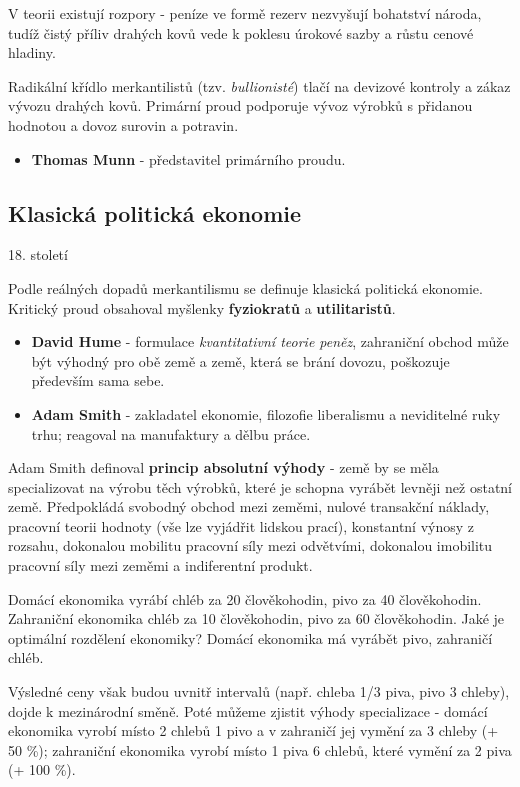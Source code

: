 V teorii existují rozpory - peníze ve formě rezerv nezvyšují bohatství národa, tudíž čistý příliv drahých kovů vede k poklesu úrokové sazby a růstu cenové hladiny.

Radikální křídlo merkantilistů (tzv. \textit{bullionisté}) tlačí na devizové kontroly a zákaz vývozu drahých kovů. Primární proud podporuje vývoz výrobků s přidanou hodnotou a dovoz surovin a potravin.

\begin{itemize}
    \item \textbf{Thomas Munn} - představitel primárního proudu.
\end{itemize}

\subsection{Klasická politická ekonomie}
\epigraph{18. století}{}

Podle reálných dopadů merkantilismu se definuje klasická politická ekonomie. Kritický proud obsahoval myšlenky \textbf{fyziokratů} a \textbf{utilitaristů}.

\begin{itemize}
    \item \textbf{David Hume} - formulace \textit{kvantitativní teorie peněz}, zahraniční obchod může být výhodný pro obě země a země, která se brání dovozu, poškozuje především sama sebe.
    \item \textbf{Adam Smith} - zakladatel ekonomie, filozofie liberalismu a neviditelné ruky trhu; reagoval na manufaktury a dělbu práce.
\end{itemize}

Adam Smith definoval \textbf{princip absolutní výhody} - země by se měla specializovat na výrobu těch výrobků, které je schopna vyrábět levněji než ostatní země. Předpokládá svobodný obchod mezi zeměmi, nulové transakční náklady, pracovní teorii hodnoty (vše lze vyjádřit lidskou prací), konstantní výnosy z rozsahu, dokonalou mobilitu pracovní síly mezi odvětvími, dokonalou imobilitu pracovní síly mezi zeměmi a indiferentní produkt.

\begin{example}\begin{displayquote}
Domácí ekonomika vyrábí chléb za 20 člověkohodin, pivo za 40 člověkohodin. Zahraniční ekonomika chléb za 10 člověkohodin, pivo za 60 člověkohodin. Jaké je optimální rozdělení ekonomiky? Domácí ekonomika má vyrábět pivo, zahraničí chléb.

Výsledné ceny však budou uvnitř intervalů (např. chleba 1/3 piva, pivo 3 chleby), dojde k mezinárodní směně. Poté můžeme zjistit výhody specializace - domácí ekonomika vyrobí místo 2 chlebů 1 pivo a v zahraničí jej vymění za 3 chleby (+ 50 \%); zahraniční ekonomika vyrobí místo 1 piva 6 chlebů, které vymění za 2 piva (+ 100 \%).
\end{displayquote}\end{example}


